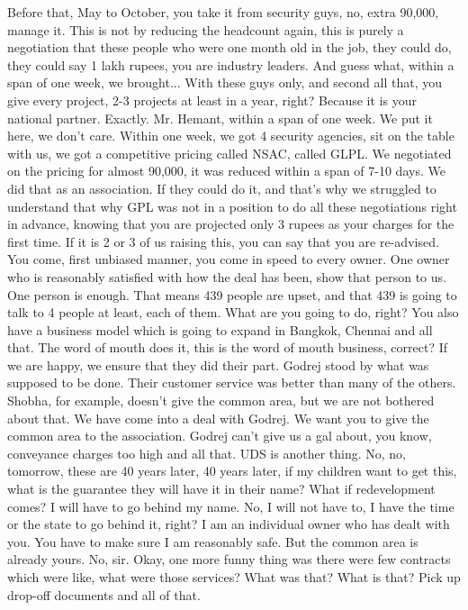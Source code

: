 Before that, May to October, you take it from security guys, no, extra 90,000, manage it.
This is not by reducing the headcount again, this is purely a negotiation that these people who were one month old in the job,
they could do, they could say 1 lakh rupees, you are industry leaders.
And guess what, within a span of one week, we brought...
With these guys only, and second all that, you give every project, 2-3 projects at least in a year, right?
Because it is your national partner.
Exactly. Mr. Hemant, within a span of one week.
We put it here, we don't care.
Within one week, we got 4 security agencies, sit on the table with us, we got a competitive pricing called NSAC, called GLPL.
We negotiated on the pricing for almost 90,000, it was reduced within a span of 7-10 days.
We did that as an association.
If they could do it, and that's why we struggled to understand that why GPL was not in a position to do all these negotiations right in advance,
knowing that you are projected only 3 rupees as your charges for the first time.
If it is 2 or 3 of us raising this, you can say that you are re-advised.
You come, first unbiased manner, you come in speed to every owner.
One owner who is reasonably satisfied with how the deal has been, show that person to us.
One person is enough. That means 439 people are upset,
and that 439 is going to talk to 4 people at least, each of them.
What are you going to do, right?
You also have a business model which is going to expand in Bangkok, Chennai and all that.
The word of mouth does it, this is the word of mouth business, correct?
If we are happy, we ensure that they did their part.
Godrej stood by what was supposed to be done.
Their customer service was better than many of the others.
Shobha, for example, doesn't give the common area, but we are not bothered about that.
We have come into a deal with Godrej.
We want you to give the common area to the association.
Godrej can't give us a gal about, you know, conveyance charges too high and all that.
UDS is another thing.
No, no, tomorrow, these are 40 years later, 40 years later, if my children want to get this,
what is the guarantee they will have it in their name?
What if redevelopment comes? I will have to go behind my name.
No, I will not have to, I have the time or the state to go behind it, right?
I am an individual owner who has dealt with you.
You have to make sure I am reasonably safe.
But the common area is already yours.
No, sir.
Okay, one more funny thing was there were few contracts which were like, what were those services?
What was that?
What is that? Pick up drop-off documents and all of that.

